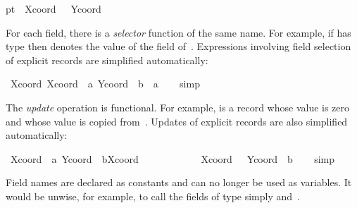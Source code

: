 \begin{isabellebody}
{\isachardoublequoteopen}pt{}\ {\isasymequiv}\ {\isasymlparr}Xcoord\ {\isacharequal}\ {\isacharminus}{}{}{\isacharcomma}\ Ycoord\ {\isacharequal}\ {}{}{\isasymrparr}{\isachardoublequoteclose}%
\begin{isamarkuptext}%
For each field, there is a \emph{selector}
  function of the same name.  For example, if  has type  then  denotes the value of the  field of~.  Expressions involving field selection
  of explicit records are simplified automatically:%
\end{isamarkuptext}%
\isamarkuptrue%
\isamarkupfalse%
\ {\isachardoublequoteopen}Xcoord\ {\isasymlparr}Xcoord\ {\isacharequal}\ a{\isacharcomma}\ Ycoord\ {\isacharequal}\ b{\isasymrparr}\ {\isacharequal}\ a{\isachardoublequoteclose}\isanewline
%
\isadelimproof
\ \ %
\endisadelimproof
%
\isatagproof
{}\isamarkupfalse%
\ simp%
\endisatagproof
{\isafoldproof}%
%
\isadelimproof
%
\endisadelimproof
%
\begin{isamarkuptext}%
The \emph{update} operation is functional.  For
  example,  is a record whose 
  value is zero and whose  value is copied from~.  Updates of explicit records are also simplified automatically:%
\end{isamarkuptext}%
\isamarkuptrue%
\isamarkupfalse%
\ {\isachardoublequoteopen}{\isasymlparr}Xcoord\ {\isacharequal}\ a{\isacharcomma}\ Ycoord\ {\isacharequal}\ b{\isasymrparr}{\isasymlparr}Xcoord\ {\isacharcolon}{\isacharequal}\ {}{\isasymrparr}\ {\isacharequal}\isanewline
\ \ \ \ \ \ \ \ \ {\isasymlparr}Xcoord\ {\isacharequal}\ {}{\isacharcomma}\ Ycoord\ {\isacharequal}\ b{\isasymrparr}{\isachardoublequoteclose}\isanewline
%
\isadelimproof
\ \ %
\endisadelimproof
%
\isatagproof
{}\isamarkupfalse%
\ simp%
\endisatagproof
{\isafoldproof}%
%
\isadelimproof
%
\endisadelimproof
%
\begin{isamarkuptext}%
\begin{warn}
  Field names are declared as constants and can no longer be used as
  variables.  It would be unwise, for example, to call the fields of
  type  simply  and~.
  \end{warn}%
\end{isamarkuptext}%
\isamarkuptrue%
%
\isamarkuptrue%
%
\begin{isamarkuptext}%
%


\end{isamarkuptext}
\end{isabellebody}
